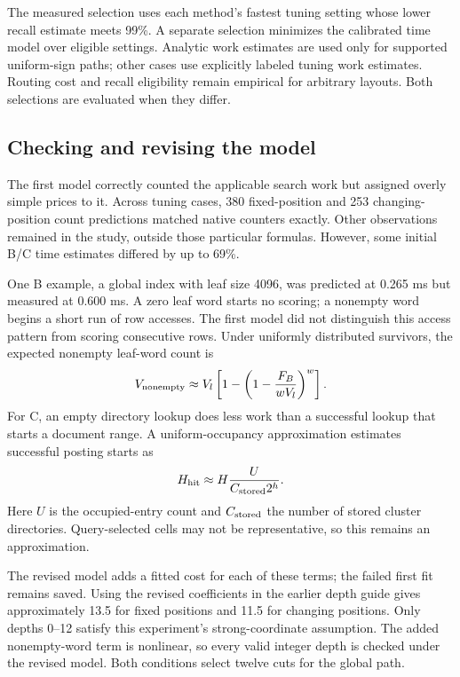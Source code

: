 The measured selection uses each method's fastest tuning setting whose lower recall estimate
meets 99\%. A separate selection minimizes the calibrated time model over eligible settings.
Analytic work estimates are used only for supported uniform-sign paths; other cases use
explicitly labeled tuning work estimates. Routing cost and recall eligibility remain empirical
for arbitrary layouts. Both selections are evaluated when they differ.

\newpage
\subsection{Checking and revising the model}
The first model correctly counted the applicable search work but assigned overly simple
prices to it. Across tuning cases, 380 fixed-position and 253 changing-position count predictions
matched native counters exactly. Other observations remained in the study, outside those
particular formulas. However, some initial B/C time estimates differed by up to 69\%.

One B example, a global index with leaf size 4096, was predicted at 0.265 ms but measured at
0.600 ms. A zero leaf word starts no scoring; a nonempty word begins a short run of row
accesses. The first model did not distinguish this access pattern from scoring consecutive
rows. Under uniformly distributed survivors, the expected nonempty leaf-word count is
\begin{equation}
 V_{\rm nonempty}\approx V_l\left[1-\left(1-\frac{F_B}{wV_l}\right)^w\right].
 \label{eq:nonempty}
\end{equation}
For C, an empty directory lookup does less work than a successful lookup that starts a
document range. A uniform-occupancy approximation estimates successful posting starts as
\begin{equation}
 H_{\rm hit}\approx H\frac{U}{C_{\rm stored}2^h}.
 \label{eq:posting-hits}
\end{equation}
Here $U$ is the occupied-entry count and $C_{\rm stored}$ the number of stored cluster
directories. Query-selected cells may not be representative, so this remains an approximation.

The revised model adds a fitted cost for each of these terms; the failed first fit remains
saved. Using the revised coefficients in the earlier depth guide gives approximately 13.5
for fixed positions and 11.5 for changing positions. Only depths 0--12 satisfy this experiment's
strong-coordinate assumption.
The added nonempty-word term is nonlinear, so every valid integer depth is checked under
the revised model. Both conditions select twelve cuts for the global path.

